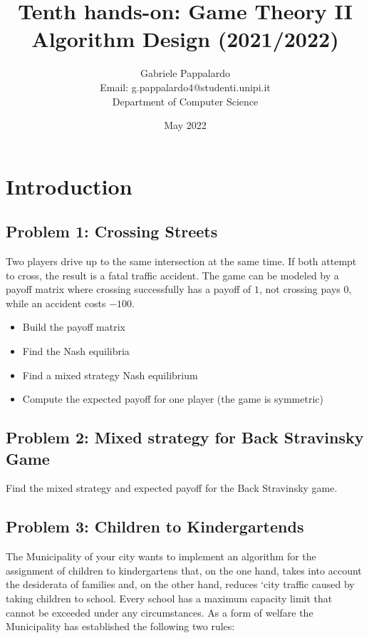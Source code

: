 \documentclass{article}
\title{Tenth hands-on: Game Theory II\\[1ex] \large Algorithm Design (2021/2022)}
\author{Gabriele Pappalardo\\Email: g.pappalardo4@studenti.unipi.it\\Department of Computer Science}
\date{May 2022}
\begin{document}
\maketitle

\section{Introduction}

\subsection[]{Problem 1: Crossing Streets}

Two players drive up to the same intersection at the same time. If both attempt to cross, the result is a fatal traffic accident. 
The game can be modeled by a payoff matrix where crossing successfully has a payoff of $1$, not crossing pays $0$, while an accident costs $−100$.

\begin{itemize}
    \item Build the payoff matrix 
    \item Find the Nash equilibria 
    \item Find a mixed strategy Nash equilibrium 
    \item Compute the expected payoff for one player (the game is symmetric) 
\end{itemize}

\subsection[]{Problem 2: Mixed strategy for Back Stravinsky Game}

Find the mixed strategy and expected payoff for the Back Stravinsky game.

\subsection[]{Problem 3: Children to Kindergartends}

The Municipality of your city wants to implement an algorithm for the assignment of children to kindergartens that, on the one hand, takes into account 
the desiderata of families and, on the other hand, reduces `city traffic caused by taking children to school. 
Every school has a maximum capacity limit that cannot be exceeded under any circumstances.
As a form of welfare the Municipality has established the following two rules:  
\end{document}
